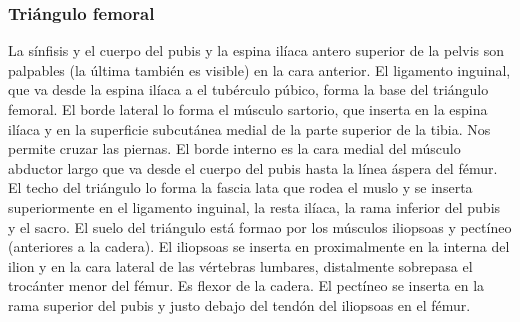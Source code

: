 \documentclass[a4paper,12pt]{article} %
\begin{document}
\begin{appendices}
\subsubsection{Triángulo femoral}
La sínfisis y el cuerpo del pubis y la espina ilíaca antero superior de la pelvis son palpables (la última también es visible) en la cara anterior. El ligamento inguinal, que va desde la espina ilíaca a el tubérculo púbico, forma la base del triángulo femoral. El borde lateral lo forma el músculo sartorio, que inserta en la espina ilíaca y en la superficie subcutánea medial de la parte superior de la tibia. Nos permite cruzar las piernas. El borde interno es la cara medial del músculo abductor largo que va desde el cuerpo del pubis hasta la línea áspera del fémur. El techo del triángulo lo forma la fascia lata que rodea el muslo y se inserta superiormente  en el ligamento inguinal, la resta ilíaca, la rama inferior del pubis y el sacro. El suelo del triángulo está formao por los músculos iliopsoas y pectíneo (anteriores a la cadera). El iliopsoas se inserta en proximalmente en la interna del ilion y en la cara lateral de las vértebras lumbares, distalmente sobrepasa el trocánter menor del fémur. Es flexor de la cadera. El pectíneo se inserta en la rama superior del pubis y justo debajo del tendón del iliopsoas en el fémur.


\end{appendices}
\end{document}
